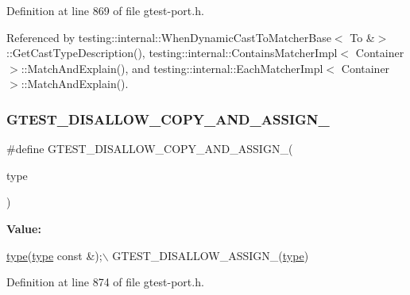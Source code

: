 Definition at line 869 of file gtest-\/port.\+h.



Referenced by testing\+::internal\+::\+When\+Dynamic\+Cast\+To\+Matcher\+Base$<$ To \&$>$\+::\+Get\+Cast\+Type\+Description(), testing\+::internal\+::\+Contains\+Matcher\+Impl$<$ Container $>$\+::\+Match\+And\+Explain(), and testing\+::internal\+::\+Each\+Matcher\+Impl$<$ Container $>$\+::\+Match\+And\+Explain().

\mbox{\label{gtest-port_8h_aed8c1888c32b588b0681e88b95031e29}} 
\subsubsection{\texorpdfstring{G\+T\+E\+S\+T\+\_\+\+D\+I\+S\+A\+L\+L\+O\+W\+\_\+\+C\+O\+P\+Y\+\_\+\+A\+N\+D\+\_\+\+A\+S\+S\+I\+G\+N\+\_\+}{GTEST\_DISALLOW\_COPY\_AND\_ASSIGN\_}}
{\footnotesize\ttfamily \#define G\+T\+E\+S\+T\+\_\+\+D\+I\+S\+A\+L\+L\+O\+W\+\_\+\+C\+O\+P\+Y\+\_\+\+A\+N\+D\+\_\+\+A\+S\+S\+I\+G\+N\+\_\+(\begin{DoxyParamCaption}\item[{}]{type }\end{DoxyParamCaption})}

{\bfseries Value\+:}
\begin{DoxyCode}
\hyperlink{namespacegenerate__debs_a50bc9a7ecac9584553e089a448bcde58}{type}(\hyperlink{namespacegenerate__debs_a50bc9a7ecac9584553e089a448bcde58}{type} \textcolor{keyword}{const} &);\(\backslash\)
  GTEST\_DISALLOW\_ASSIGN\_(\hyperlink{namespacegenerate__debs_a50bc9a7ecac9584553e089a448bcde58}{type})
\end{DoxyCode}


Definition at line 874 of file gtest-\/port.\+h.



